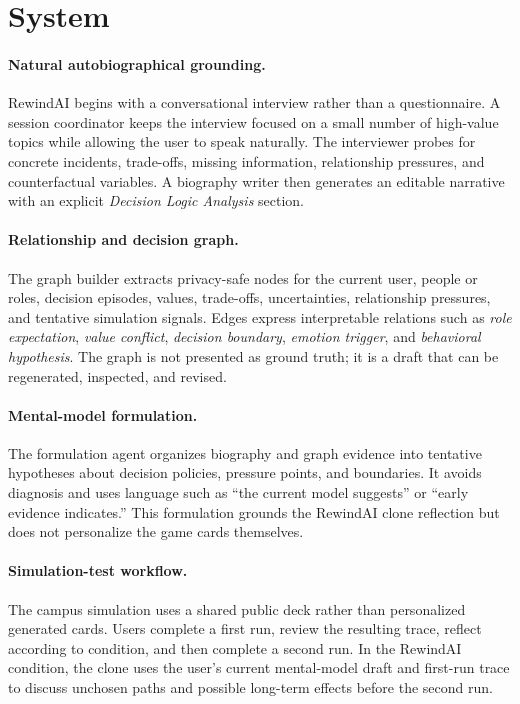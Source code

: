 \documentclass[sigconf,review,anonymous]{acmart}
\begin{document}
\section{System}

\paragraph{Natural autobiographical grounding.}
RewindAI begins with a conversational interview rather than a questionnaire. A session coordinator keeps the interview focused on a small number of high-value topics while allowing the user to speak naturally. The interviewer probes for concrete incidents, trade-offs, missing information, relationship pressures, and counterfactual variables. A biography writer then generates an editable narrative with an explicit \emph{Decision Logic Analysis} section.

\paragraph{Relationship and decision graph.}
The graph builder extracts privacy-safe nodes for the current user, people or roles, decision episodes, values, trade-offs, uncertainties, relationship pressures, and tentative simulation signals. Edges express interpretable relations such as \emph{role expectation}, \emph{value conflict}, \emph{decision boundary}, \emph{emotion trigger}, and \emph{behavioral hypothesis}. The graph is not presented as ground truth; it is a draft that can be regenerated, inspected, and revised.

\paragraph{Mental-model formulation.}
The formulation agent organizes biography and graph evidence into tentative hypotheses about decision policies, pressure points, and boundaries. It avoids diagnosis and uses language such as ``the current model suggests'' or ``early evidence indicates.'' This formulation grounds the RewindAI clone reflection but does not personalize the game cards themselves.

\paragraph{Simulation-test workflow.}
The campus simulation uses a shared public deck rather than personalized generated cards. Users complete a first run, review the resulting trace, reflect according to condition, and then complete a second run. In the RewindAI condition, the clone uses the user's current mental-model draft and first-run trace to discuss unchosen paths and possible long-term effects before the second run.
\end{document}
